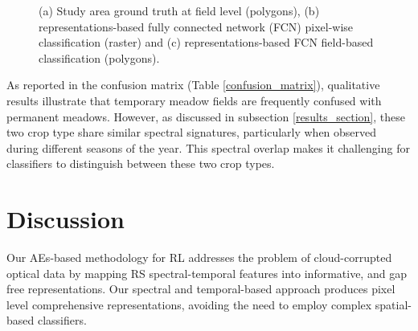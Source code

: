 \documentclass[journal,article,submit,pdftex,moreauthors]{Definitions/mdpi}
\providecommand{\DIFadd}[1]{{\protect\color{blue}\uwave{#1}}} %
\providecommand{\DIFaddbegin}{} %
\providecommand{\DIFaddend}{} %
\providecommand{\DIFaddendFL}{} %
\begin{document}
\begin{figure}[H]
\begin{subfigure}[t]{0.15\linewidth}
	\end{subfigure}
	\DIFaddendFL \caption{(a) Study area ground truth at field level (polygons), (b) representations-based fully connected network (FCN) pixel-wise classification (raster) and (c) representations-based FCN field-based classification (polygons).}
	\label{fig:maps}
\end{figure}

As reported in the confusion matrix (Table \ref{confusion_matrix}), qualitative results illustrate that temporary meadow fields are frequently confused with permanent meadows. However, as discussed in subsection \ref{results_section}, these two crop type share similar spectral signatures, particularly when observed during different seasons of the year. This spectral overlap makes it challenging for classifiers to distinguish between these two crop types. 



\section{Discussion}
Our AEs-based methodology for RL addresses the problem of cloud-corrupted optical data by mapping RS spectral-temporal features into informative, and gap free representations.
Our spectral and temporal-based approach produces pixel level comprehensive representations, \DIFaddbegin \DIFadd{while }\DIFaddend avoiding the need to employ complex spatial-based classifiers.
\end{document}
